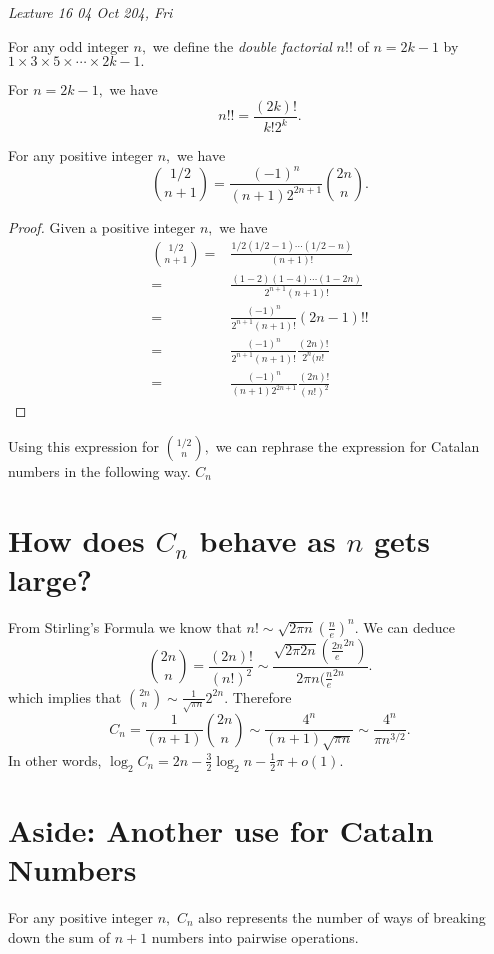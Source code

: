 
\noindent
\emph{Lexture 16 \hfill 04 Oct 204, Fri}

\begin{definition}
	For any odd integer $n,$ we define the \emph{double factorial}
	$n!!$ of $n=2k-1$ by $1 \times 3 \times  5 \times \cdots 
	\times 2k-1.$
\end{definition}
For $n = 2k-1,$ we have
$$ n!! = \frac{(2k)!}{k! 2^k}.$$


\begin{lemma}
	For any positive integer $n,$ we have
	$$ \binom{1/2}{n+1} = 
	\frac{(-1)^n}{ (n+1) 2^{2n+1}} \binom{2n}{n}.$$
\end{lemma}

\begin{proof}
	Given a positive integer $n,$ we have
	\begin{align*}
		\binom{1/2}{n+1}
		={}& \frac{1/2 (1/2-1)\cdots(1/2-n)}{(n+1)!}\\
		={}& \frac{(1-2)(1-4)\cdots(1-2n)}{2^{n+1} (n+1)!} \\
		={}& \frac{(-1)^n}{2^{n+1} (n+1)!} (2n-1)!!\\
		={}& \frac{(-1)^n}{2^{n+1} (n+1)!} \frac{(2n)!}{2^n (n!}\\
		={}& \frac{(-1)^n}{(n+1) 2^{2n+1}} \frac{(2n)!}{(n!)^2}
	\end{align*}
	
\end{proof}


Using this expression for $\binom{1/2}{n},$ we can rephrase the 
expression for Catalan numbers in the following way.
$C_n$

\section{How does $C_n$ behave as $n$ gets large?}
From Stirling's Formula we know that
$n! \sim \sqrt{2 \pi n} \left( \frac{n}{e} \right) ^n.$ We can deduce
$$ \binom{2n }{n} = 
\frac{(2n)!}{(n!)^2} \sim
\frac{\sqrt{2\pi 2n} \left( \frac{2n}{e}^{2n} \right) }{ 2\pi n (
\frac{n}{e}^{2n}}.$$
which implies that
$\binom{2n}{n} \sim \frac{1}{\sqrt{\pi n}} 2^{2n}.$
Therefore
$$ C_n = \frac{1}{(n+1)} \binom{2n}{n}
\sim \frac{4^n}{(n+1) \sqrt{\pi n}}
\sim \frac{4^n}{ \pi n^{3/2}}.$$
In other words,
$\log_2 C_n = 2n - \frac{3}{2} \log_2 n - \frac{1}{2} \pi + o(1).$

\section{Aside: Another use for Cataln Numbers}
For any positive integer $n,$ $C_n$ also represents the number of ways
of breaking down the sum of $n+1$ numbers into pairwise operations.

